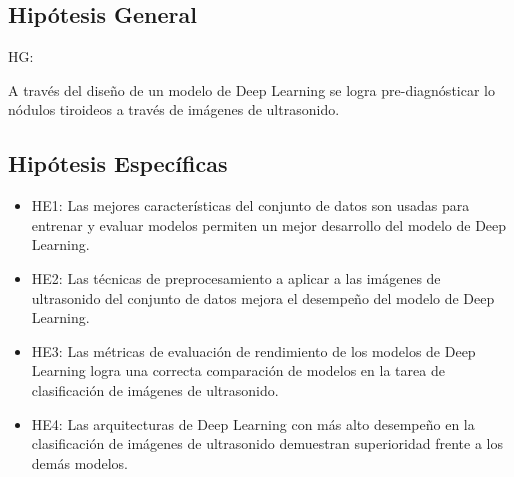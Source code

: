 \subsection{Hipótesis General}
HG: \newcommand{\HipotesisGeneral}{
A través del diseño de un modelo de Deep Learning se logra pre-diagnósticar lo nódulos tiroideos a través de imágenes de ultrasonido.
}
\HipotesisGeneral


\subsection{Hipótesis Específicas}
\newcommand{\Hone}{
Las mejores características del conjunto de datos son usadas para entrenar y evaluar  modelos permiten un mejor desarrollo del modelo de Deep Learning.
}
\newcommand{\Htwo}{
Las técnicas de preprocesamiento a aplicar a las imágenes de ultrasonido del conjunto de datos mejora el desempeño del modelo de Deep Learning.
}
\newcommand{\Hthree}{
Las métricas de evaluación de rendimiento de los modelos de Deep Learning logra una correcta comparación de modelos en la tarea de clasificación de imágenes de ultrasonido.
}
\newcommand{\Hfour}{
    Las arquitecturas de Deep Learning con más alto desempeño en la clasificación de imágenes de ultrasonido demuestran superioridad frente a los demás modelos.
}

\begin{itemize}
	\item HE1: {\Hone}
	\item HE2: {\Htwo}
	\item HE3: {\Hthree}
	\item HE4: {\Hfour}
\end{itemize}